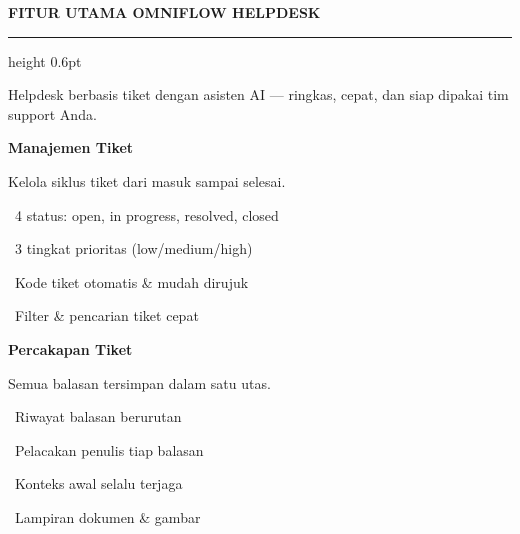 \documentclass[a4paper]{article}
\newcommand{\sectiontitle}[1]{%
    \vspace{10pt}%
    {\fontsize{13}{16}\selectfont\bfseries\color{BlueDark} #1}\par\vspace{3pt}%
    {\color{BluePrimary}\hrule height 0.6pt}\par\vspace{8pt}%
}
\begin{document}
\sectiontitle{FITUR UTAMA OMNIFLOW HELPDESK}

{\fontsize{9.5}{13}\selectfont\color{TextLight} Helpdesk berbasis tiket dengan asisten AI --- ringkas, cepat, dan siap dipakai tim support Anda.}

\vspace{6pt}

\noindent
\begin{minipage}[t]{0.485\textwidth}
    \colorbox{BluePrimary}{%
        \begin{minipage}{\dimexpr\textwidth-2\fboxsep\relax}
            {\fontsize{10}{13}\selectfont\bfseries\color{White} Manajemen Tiket}
        \end{minipage}}\par
    \vspace{4pt}
    {\fontsize{9}{12}\selectfont\color{TextDark}%
    Kelola siklus tiket dari masuk sampai selesai.\par\vspace{3pt}
    \textbullet\ 4 status: open, in progress, resolved, closed\par\vspace{2pt}%
    \textbullet\ 3 tingkat prioritas (low/medium/high)\par\vspace{2pt}%
    \textbullet\ Kode tiket otomatis \& mudah dirujuk\par\vspace{2pt}%
    \textbullet\ Filter \& pencarian tiket cepat}%

\end{minipage}%
\hfill
\begin{minipage}[t]{0.485\textwidth}
    \colorbox{EmeraldPrimary}{%
        \begin{minipage}{\dimexpr\textwidth-2\fboxsep\relax}
            {\fontsize{10}{13}\selectfont\bfseries\color{White} Percakapan Tiket}
        \end{minipage}}\par
    \vspace{4pt}
    {\fontsize{9}{12}\selectfont\color{TextDark}%
    Semua balasan tersimpan dalam satu utas.\par\vspace{3pt}
    \textbullet\ Riwayat balasan berurutan\par\vspace{2pt}%
    \textbullet\ Pelacakan penulis tiap balasan\par\vspace{2pt}%
    \textbullet\ Konteks awal selalu terjaga\par\vspace{2pt}%
    \textbullet\ Lampiran dokumen \& gambar}%

\end{minipage}
\end{document}
